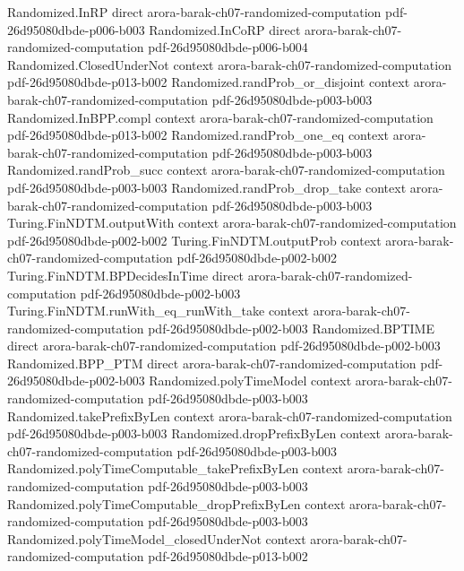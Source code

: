 \begin{theorem}
\proofstep
  {Randomized.InRP}
  {direct}
  {arora-barak-ch07-randomized-computation}
  {pdf-26d95080dbde-p006-b003}
\proofstep
  {Randomized.InCoRP}
  {direct}
  {arora-barak-ch07-randomized-computation}
  {pdf-26d95080dbde-p006-b004}
\proofstep
  {Randomized.ClosedUnderNot}
  {context}
  {arora-barak-ch07-randomized-computation}
  {pdf-26d95080dbde-p013-b002}
\proofstep
  {Randomized.randProb_or_disjoint}
  {context}
  {arora-barak-ch07-randomized-computation}
  {pdf-26d95080dbde-p003-b003}
\proofstep
  {Randomized.InBPP.compl}
  {context}
  {arora-barak-ch07-randomized-computation}
  {pdf-26d95080dbde-p013-b002}
\proofstep
  {Randomized.randProb_one_eq}
  {context}
  {arora-barak-ch07-randomized-computation}
  {pdf-26d95080dbde-p003-b003}
\proofstep
  {Randomized.randProb_succ}
  {context}
  {arora-barak-ch07-randomized-computation}
  {pdf-26d95080dbde-p003-b003}
\proofstep
  {Randomized.randProb_drop_take}
  {context}
  {arora-barak-ch07-randomized-computation}
  {pdf-26d95080dbde-p003-b003}
\proofstep
  {Turing.FinNDTM.outputWith}
  {context}
  {arora-barak-ch07-randomized-computation}
  {pdf-26d95080dbde-p002-b002}
\proofstep
  {Turing.FinNDTM.outputProb}
  {context}
  {arora-barak-ch07-randomized-computation}
  {pdf-26d95080dbde-p002-b002}
\proofstep
  {Turing.FinNDTM.BPDecidesInTime}
  {direct}
  {arora-barak-ch07-randomized-computation}
  {pdf-26d95080dbde-p002-b003}
\proofstep
  {Turing.FinNDTM.runWith_eq_runWith_take}
  {context}
  {arora-barak-ch07-randomized-computation}
  {pdf-26d95080dbde-p002-b003}
\proofstep
  {Randomized.BPTIME}
  {direct}
  {arora-barak-ch07-randomized-computation}
  {pdf-26d95080dbde-p002-b003}
\proofstep
  {Randomized.BPP_PTM}
  {direct}
  {arora-barak-ch07-randomized-computation}
  {pdf-26d95080dbde-p002-b003}
\proofstep
  {Randomized.polyTimeModel}
  {context}
  {arora-barak-ch07-randomized-computation}
  {pdf-26d95080dbde-p003-b003}
\proofstep
  {Randomized.takePrefixByLen}
  {context}
  {arora-barak-ch07-randomized-computation}
  {pdf-26d95080dbde-p003-b003}
\proofstep
  {Randomized.dropPrefixByLen}
  {context}
  {arora-barak-ch07-randomized-computation}
  {pdf-26d95080dbde-p003-b003}
\proofstep
  {Randomized.polyTimeComputable_takePrefixByLen}
  {context}
  {arora-barak-ch07-randomized-computation}
  {pdf-26d95080dbde-p003-b003}
\proofstep
  {Randomized.polyTimeComputable_dropPrefixByLen}
  {context}
  {arora-barak-ch07-randomized-computation}
  {pdf-26d95080dbde-p003-b003}
\proofstep
  {Randomized.polyTimeModel_closedUnderNot}
  {context}
  {arora-barak-ch07-randomized-computation}
  {pdf-26d95080dbde-p013-b002}

\end{theorem}
